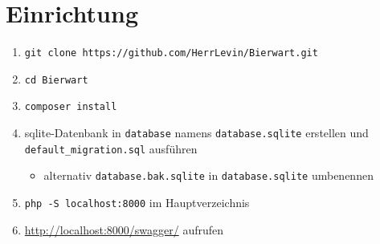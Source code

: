 \documentclass[12pt,a4paper,titlepage,ngerman,pdftex]{report}
\begin{document}
\section{Einrichtung}\label{sec:einrichtung}

\begin{enumerate}
    \item \texttt{git clone https://github.com/HerrLevin/Bierwart.git}
    \item \texttt{cd Bierwart}
    \item \texttt{composer install}
    \item sqlite-Datenbank in \texttt{database} namens \texttt{database.sqlite} erstellen und\\ \texttt{default\_migration.sql} ausführen
        \begin{itemize}
            \item alternativ \texttt{database.bak.sqlite} in \texttt{database.sqlite} umbenennen
        \end{itemize}
    \item \texttt{php -S localhost:8000} im Hauptverzeichnis
    \item \url{http://localhost:8000/swagger/} aufrufen
\end{enumerate}
\end{document}
